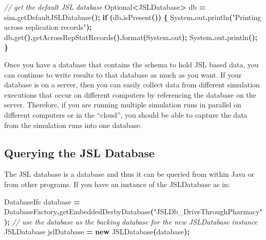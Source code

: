 \documentclass[
]{book}
\newenvironment{Shaded}{\begin{snugshade}}{\end{snugshade}}
\newcommand{\BuiltInTok}[1]{#1}
\newcommand{\CommentTok}[1]{\textcolor[rgb]{0.56,0.35,0.01}{\textit{#1}}}
\newcommand{\ControlFlowTok}[1]{\textcolor[rgb]{0.13,0.29,0.53}{\textbf{#1}}}
\newcommand{\FunctionTok}[1]{\textcolor[rgb]{0.00,0.00,0.00}{#1}}
\newcommand{\KeywordTok}[1]{\textcolor[rgb]{0.13,0.29,0.53}{\textbf{#1}}}
\newcommand{\NormalTok}[1]{#1}
\newcommand{\OperatorTok}[1]{\textcolor[rgb]{0.81,0.36,0.00}{\textbf{#1}}}
\newcommand{\StringTok}[1]{\textcolor[rgb]{0.31,0.60,0.02}{#1}}
\theoremstyle{definition}
\theoremstyle{definition}
\theoremstyle{definition}
\theoremstyle{definition}
\theoremstyle{remark}
\begin{document}
\begin{Shaded}
\begin{Highlighting}[]
\CommentTok{// get the default JSL database}
\NormalTok{Optional}\OperatorTok{\textless{}}\NormalTok{JSLDatabase}\OperatorTok{\textgreater{}}\NormalTok{ db }\OperatorTok{=}\NormalTok{ sim}\OperatorTok{.}\FunctionTok{getDefaultJSLDatabase}\OperatorTok{();}
\ControlFlowTok{if} \OperatorTok{(}\NormalTok{db}\OperatorTok{.}\FunctionTok{isPresent}\OperatorTok{())} \OperatorTok{\{}
    \BuiltInTok{System}\OperatorTok{.}\FunctionTok{out}\OperatorTok{.}\FunctionTok{println}\OperatorTok{(}\StringTok{"Printing across replication records"}\OperatorTok{);}
\NormalTok{    db}\OperatorTok{.}\FunctionTok{get}\OperatorTok{().}\FunctionTok{getAcrossRepStatRecords}\OperatorTok{().}\FunctionTok{format}\OperatorTok{(}\BuiltInTok{System}\OperatorTok{.}\FunctionTok{out}\OperatorTok{);}
    \BuiltInTok{System}\OperatorTok{.}\FunctionTok{out}\OperatorTok{.}\FunctionTok{println}\OperatorTok{();}
\OperatorTok{\}}
\end{Highlighting}
\end{Shaded}

Once you have a database that contains the schema to hold JSL based
data, you can continue to write results to that database as much as you
want. If your database is on a server, then you can easily collect data
from different simulation executions that occur on different computers
by referencing the database on the server. Therefore, if you are running
multiple simulation runs in parallel on different computers or in the
``cloud'', you should be able to capture the data from the simulation runs
into one database.

\hypertarget{querying-the-jsl-database}{%
\subsection{Querying the JSL Database}\label{querying-the-jsl-database}}

The JSL database is a database and thus it can be queried from within
Java or from other programs. If you have an instance of the JSLDatabase
as in:

\begin{Shaded}
\begin{Highlighting}[]
\NormalTok{DatabaseIfc database }\OperatorTok{=}\NormalTok{ DatabaseFactory}\OperatorTok{.}\FunctionTok{getEmbeddedDerbyDatabase}\OperatorTok{(}\StringTok{"JSLDb\_DriveThroughPharmacy"}\OperatorTok{);}
\CommentTok{// use the database as the backing database for the new JSLDatabase instance}
\NormalTok{JSLDatabase jslDatabase }\OperatorTok{=} \KeywordTok{new} \FunctionTok{JSLDatabase}\OperatorTok{(}\NormalTok{database}\OperatorTok{);}
\end{Highlighting}
\end{Shaded}
\end{document}
